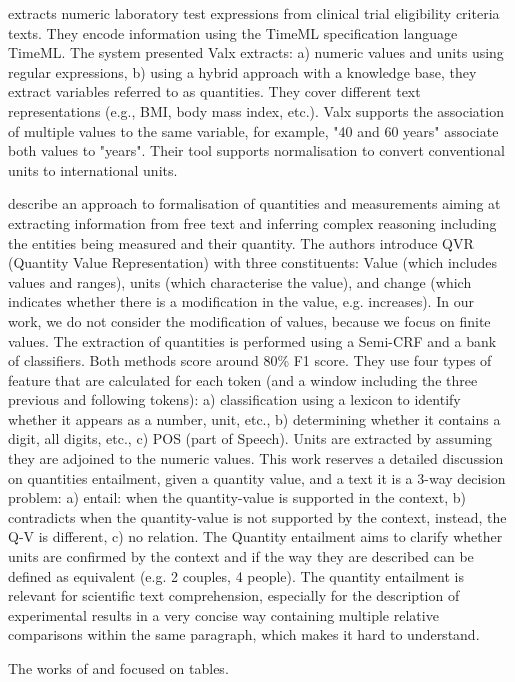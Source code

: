 \cite{hao2016} extracts numeric laboratory test expressions from clinical trial eligibility criteria texts. 
They encode information using the TimeML specification language TimeML. The system presented Valx extracts: a) numeric values and units using regular expressions, b) using a hybrid approach with a knowledge base, they extract variables referred to as quantities. They cover different text representations (e.g., BMI, body mass index, etc.). Valx supports the association of multiple values to the same variable, for example, "40 and 60 years" associate both values to "years". Their tool supports normalisation to convert conventional units to international units. 

\cite{roy2015reasoning} describe an approach to formalisation of quantities and measurements aiming at extracting information from free text and inferring complex reasoning including the entities being measured and their quantity. 
The authors introduce QVR (Quantity Value Representation) with three constituents: Value (which includes values and ranges), units (which characterise the value), and change (which indicates whether there is a modification in the value, e.g. increases). 
In our work, we do not consider the modification of values, because we focus on finite values. 
The extraction of quantities is performed using a Semi-CRF and a bank of classifiers. Both methods score around 80\% F1 score. 
They use four types of feature that are calculated for each token (and a window including the three previous and following tokens): a) classification using a lexicon to identify whether it appears as a number, unit, etc., b) determining whether it contains a digit, all digits, etc., c) POS (part of Speech). Units are extracted by assuming they are adjoined to the numeric values. 
This work reserves a detailed discussion on quantities entailment, given a quantity value, and a text it is a 3-way decision problem: a) entail: when the quantity-value is supported in the context, b) contradicts when the quantity-value is not supported by the context, instead, the Q-V is different, c) no relation. 
The Quantity entailment aims to clarify whether units are confirmed by the context and if the way they are described can be defined as equivalent (e.g. 2 couples, 4 people). The quantity entailment is relevant for scientific text comprehension, especially for the description of experimental results in a very concise way containing multiple relative comparisons within the same paragraph, which makes it hard to understand. 

The works of \cite{taha2021identifying} and \cite{ho2021qute} focused on tables.

